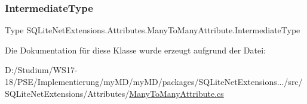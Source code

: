 \subsubsection{\texorpdfstring{Intermediate\+Type}{IntermediateType}}
{\footnotesize\ttfamily Type S\+Q\+Lite\+Net\+Extensions.\+Attributes.\+Many\+To\+Many\+Attribute.\+Intermediate\+Type\hspace{0.3cm}{\ttfamily [get]}}



Die Dokumentation für diese Klasse wurde erzeugt aufgrund der Datei\+:\begin{DoxyCompactItemize}
\item 
D\+:/\+Studium/\+W\+S17-\/18/\+P\+S\+E/\+Implementierung/my\+M\+D/my\+M\+D/packages/\+S\+Q\+Lite\+Net\+Extensions.../src/\+S\+Q\+Lite\+Net\+Extensions/\+Attributes/\mbox{\hyperlink{_many_to_many_attribute_8cs}{Many\+To\+Many\+Attribute.\+cs}}\end{DoxyCompactItemize}
